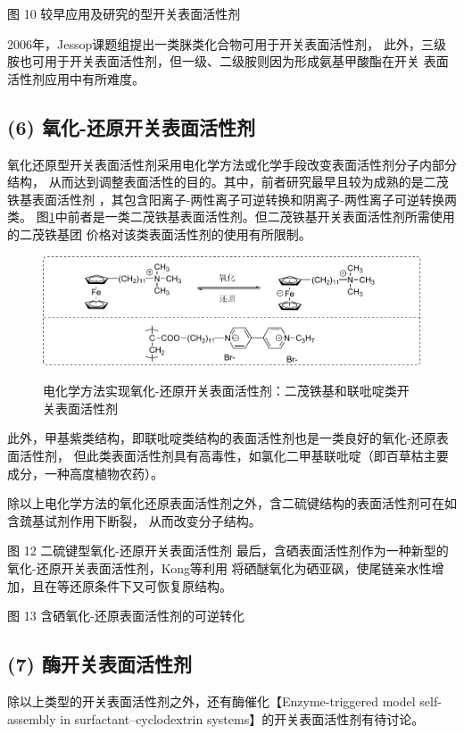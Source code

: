 \documentclass[bachelor,fandolfonts,replaceperiod]{jnuthesis} %
\begin{document}
    图 10 较早应用及研究的型开关表面活性剂
    
    2006年，Jessop课题组\cite{liu2006science}提出一类脒类化合物可用于开关表面活性剂，
    此外，三级胺也可用于开关表面活性剂，但一级、二级胺则因为形成氨基甲酸酯在开关
    表面活性剂应用中有所难度\cite{jessop2012}。
    \subsection*{(6) 氧化-还原开关表面活性剂}
    氧化还原型开关表面活性剂采用电化学方法或化学手段改变表面活性剂分子内部分结构，
    从而达到调整表面活性的目的。其中，前者研究最早且较为成熟的是二茂铁基表面活性剂
    ，其包含阳离子-两性离子可逆转换和阴离子-两性离子可逆转换两类\cite{李云霞2011}。
    图\ref{fig:switchable-redox-cp2fe}中前者是一类二茂铁基表面活性剂。但二茂铁基开关表面活性剂所需使用的二茂铁基团
    价格对该类表面活性剂的使用有所限制。
    
    \begin{figure}[htbp]
        \centering
        \includegraphics[width= \textwidth]{Figure/switchable-cp2fe.pdf}\\
        \caption{电化学方法实现氧化-还原开关表面活性剂：二茂铁基和联吡啶类开关表面活性剂}\label{fig:switchable-redox-cp2fe}
    \end{figure}
    
    此外，甲基紫类结构，即联吡啶类结构的表面活性剂也是一类良好的氧化-还原表面活性剂，
    但此类表面活性剂具有高毒性，如氯化二甲基联吡啶（即百草枯主要成分，一种高度植物农药）。
    
    除以上电化学方法的氧化还原表面活性剂之外，含二硫键结构的表面活性剂可在如含巯基试剂作用下断裂，
    从而改变分子结构。
    
    图 12 二硫键型氧化-还原开关表面活性剂
    最后，含硒表面活性剂作为一种新型的氧化-还原开关表面活性剂，Kong等\cite{kong2016redox}利用
    将硒醚氧化为硒亚砜，使尾链亲水性增加，且在等还原条件下又可恢复原结构。
    
    图 13 含硒氧化-还原表面活性剂的可逆转化\cite{kong2016redox}
    
    \subsection*{(7) 酶开关表面活性剂}
    除以上类型的开关表面活性剂之外，还有酶催化\cite{ku2011}【Enzyme-triggered model self-assembly in surfactant–cyclodextrin systems】的开关表面活性剂有待讨论。
    
\end{document}
